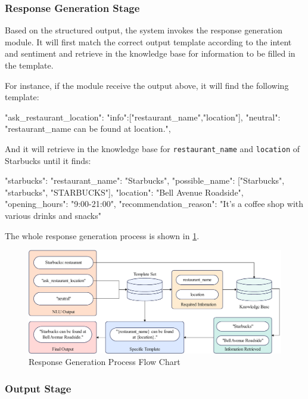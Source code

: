 \documentclass{xum_review}
\begin{document}
	\subsubsection{Response Generation Stage}

	Based on the structured output, the system invokes the response generation
	module. It will first match the correct output template according to
	the intent and sentiment and retrieve in the knowledge base for information
	to be filled in the template.

	For instance, if the module receive the output above, it will find the following
	template:\\
	\begin{json}
	{
	"ask_restaurant_location":{
		"info":["restaurant_name","location"],
		"neutral": "{restaurant_name} can be found at {location}.",
	}
	}
	\end{json}

	And it will retrieve in the knowledge base for \texttt{restaurant\_name} and \texttt{location}
	of Starbucks until it finds:\\
	\begin{json}
	"starbucks": {
      "restaurant_name": "Starbucks",
      "possible_name": ["Starbucks", "starbucks", "STARBUCKS"],
      "location": "Bell Avenue Roadside",
      "opening_hours": "9:00-21:00",
      "recommendation_reason": "It's a coffee shop with various drinks and snacks"
    }
	\end{json}

	The whole response generation process is shown in \cref{fig:response_generation_process}.

	\begin{figure}[H]
		\centering
		\includegraphics[width=1\textwidth]{figure/response.pdf}
		\caption{Response Generation Process Flow Chart}
		\label{fig:response_generation_process}
	\end{figure}

	\subsubsection{Output Stage}
\end{document}
